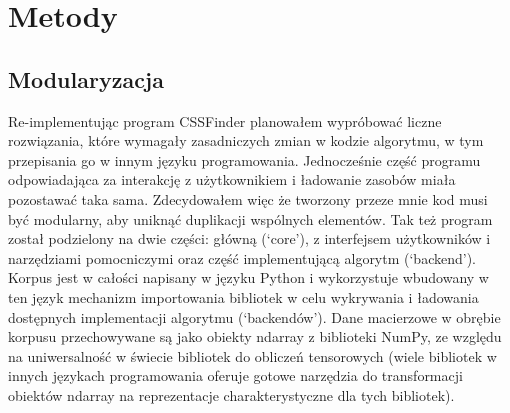 \documentclass[11pt, a4paper]{article}
\begin{document}
\begin{sloppypar}
    \section{Metody}

    \subsection{Modularyzacja}
    Re-implementując program CSSFinder planowałem wypróbować liczne rozwiązania, które wymagały
    zasadniczych zmian w kodzie algorytmu, w tym przepisania go w innym języku
    programowania. Jednocześnie część programu odpowiadająca za interakcję z użytkownikiem
    i ładowanie zasobów miała pozostawać taka sama. Zdecydowałem więc że tworzony przeze
    mnie kod musi być modularny, aby uniknąć duplikacji wspólnych elementów. Tak też
    program został podzielony na dwie części: główną (`core'), z interfejsem
    użytkowników i narzędziami pomocniczymi oraz część implementującą algorytm (`backend').
    Korpus jest w całości napisany w języku Python i wykorzystuje wbudowany w ten język mechanizm
    importowania bibliotek w celu wykrywania i ładowania dostępnych implementacji algorytmu
    (`backendów'). Dane macierzowe w obrębie korpusu przechowywane są jako obiekty
    ndarray z biblioteki NumPy, ze względu na uniwersalność w świecie bibliotek do obliczeń
    tensorowych (wiele bibliotek w innych językach programowania oferuje gotowe
    narzędzia do transformacji obiektów ndarray na reprezentacje charakterystyczne dla
    tych bibliotek).


\end{sloppypar}
\end{document}
